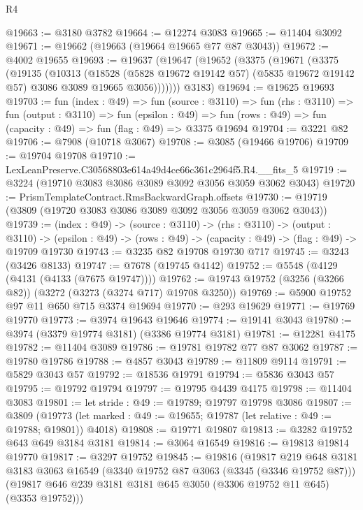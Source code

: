 \begin{lexlean}{R4}
\begin{coremodule}
@19663 := @3180 @3782
@19664 := @12274 @3083
@19665 := @11404 @3092
@19671 := @19662 (@19663 (@19664 @19665 @77 @87 @3043))
@19672 := @4002 @19655
@19693 := @19637
    (@19647
      (@19652
        (@3375
          (@19671
            (@3375
              (@19135
                (@10313
                  (@18528
                    (@5828 @19672 @19142 @57)
                    (@5835 @19672 @19142 @57)
                    @3086
                    @3089
                    @19665
                    @3056)))))))
      @3183)
@19694 := @19625 @19693
@19703 := fun (index : @49) =>
  fun (source : @3110) =>
  fun (rhs : @3110) =>
  fun (output : @3110) =>
  fun (epsilon : @49) =>
  fun (rows : @49) => fun (capacity : @49) => fun (flag : @49) => @3375 @19694
@19704 := @3221 @82
@19706 := @7908 (@10718 @3067)
@19708 := @3085 (@19466 @19706)
@19709 := @19704 @19708
@19710 := LexLeanPreserve.C30568803e614a49d4ce66c361c2964f5.R4.__fits_5
@19719 := @3224 (@19710 @3083 @3086 @3089 @3092 @3056 @3059 @3062 @3043)
@19720 := PrismTemplateContract.RmsBackwardGraph.offsets
@19730 := @19719 (@3809 (@19720 @3083 @3086 @3089 @3092 @3056 @3059 @3062 @3043))
@19739 := (index : @49) ->
  (source : @3110) ->
  (rhs : @3110) ->
  (output : @3110) ->
  (epsilon : @49) -> (rows : @49) -> (capacity : @49) -> (flag : @49) -> @19709 @19730
@19743 := @3235 @82 @19708 @19730 @717
@19745 := @3243 (@3426 @8133)
@19747 := @7678 (@19745 @4142)
@19752 := @5548 (@4129 (@4131 (@4133 (@7675 @19747))))
@19762 := @19743 @19752 (@3256 (@3266 @82)) (@3272 (@3273 (@3274 @717) @19708 @3250))
@19769 := @5900 @19752 @97 @11 @650 @715 @3374 @19694
@19770 := @293 @19629
@19771 := @19769 @19770
@19773 := @3974 @19643 @19646
@19774 := @19141 @3043
@19780 := @3974 (@3379 @19774 @3181) (@3386 @19774 @3181)
@19781 := @12281 @4175
@19782 := @11404 @3089
@19786 := @19781 @19782 @77 @87 @3062
@19787 := @19780 @19786
@19788 := @4857 @3043
@19789 := @11809 @9114
@19791 := @5829 @3043 @57
@19792 := @18536 @19791
@19794 := @5836 @3043 @57
@19795 := @19792 @19794
@19797 := @19795 @4439 @4175
@19798 := @11404 @3083
@19801 := let stride : @49 := @19789; @19797 @19798 @3086
@19807 := @3809
    (@19773 (let marked : @49 := @19655; @19787 (let relative : @49 := @19788; @19801)) @4018)
@19808 := @19771 @19807
@19813 := @3282 @19752 @643 @649 @3184 @3181
@19814 := @3064 @16549
@19816 := @19813 @19814 @19770
@19817 := @3297 @19752
@19845 := @19816
    (@19817
      @219
      @648
      @3181
      @3183
      @3063
      @16549
      (@3340 @19752 @87 @3063 (@3345 (@3346 @19752 @87)))
      (@19817 @646 @239 @3181 @3181 @645 @3050 (@3306 @19752 @11 @645) (@3353 @19752)))

\end{coremodule}
\end{lexlean}
